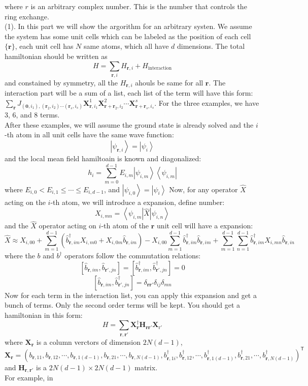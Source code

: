 \documentclass[letter]{article}
\begin{document}
where $r$ is an arbitrary complex number. This is the number that controls the ring exchange.
\\
\indent (1). In this part we will show the argorithm for an arbitrary systen. We assume the system has some unit cells which can be labeled as the position of each cell $\{\bm{r}\}$, each unit cell has $N$ same atoms, which all have $d$ dimensions. The total hamiltonian should be written as $$
H=\sum_{\bm{r},i}H_{\bm{r},i}+H_{\mathrm{interaction}}
$$ and constained by symmetry, all the $H_{\bm{r},i}$ ahouls be same for all $\bm{r}$. The interaction part will be a sum of a list, each list of the term will have this form: $\sum_{\bm{r}}J_{(\bm{0},i_1),(\bm{r}_2,i_2)\cdots (\bm{r}_s,i_s)} \bm{X}^1_{\bm{r},i_1} \bm{X}^2_{\bm{r}+\bm{r}_2,i_2} \cdots\bm{X}^s_{\bm{r}+\bm{r}_s,i_s}$. For the three examples, we have 3, 6, and 8 terms. \\
 After these examples, we will assume the ground state is already solved and the $i$-th atom in all unit cells have the same wave function:$$
\left|\psi_{\bm{r},i}\right>=\left|\psi_i\right>
$$
and the local mean field hamiltoain is known and diagonalized:
$$
h_i=\sum_{m=0}^{d-1}E_{i,m}\left|\psi_{i,m}\right>\left<\psi_{i,m}\right|
$$
where $E_{i,0}<E_{i,1}\leqslant \cdots\leqslant E_{i,d-1}$, and $\left|\psi_{i,0}\right>=\left|\psi_i\right>$
Now, for any operator $\hat{X}$ acting on the $i$-th atom, we will introduce a expansion, define number: $$
X_{i,mn}=\left<\psi_{i,m}\right|\hat{X}\left|\psi_{i,n}\right>
$$
and the $\hat{X}$ operator acting on $i$-th  atom of the $\bm{r}$ unit cell will have a expansion:
$$
\hat{X}\approx X_{i,00}+\sum_{m=1}^{d-1}\left(\hat{b}_{\bm{r},im}^{\dagger}X_{i,m0}+X_{i,0m}\hat{b}_{\bm{r},im}\right)-X_{i,00}\sum_{m=1}^{d-1}\hat{b}^{\dagger}_{\bm{r},im}\hat{b}_{\bm{r},im}
+\sum_{m=1}^{d-1}\sum_{n=1}^{d-1}\hat{b}^{\dagger}_{\bm{r},im}X_{i,mn}\hat{b}_{\bm{r},in}$$
where the $b$ and $b^{\dagger}$ operators follow the commutation relations:
$$
\left[\hat{b}_{\bm{r},im},\hat{b}_{\bm{r}',jn}\right]=\left[\hat{b}^{\dagger}_{\bm{r},im},\hat{b}^{\dagger}_{\bm{r}',jn}\right]=0$$
$$
\left[\hat{b}_{\bm{r},im},\hat{b}^{\dagger}_{\bm{r}',jn}\right]=\delta_{\bm{r}\bm{r}'}\delta_{ij}\delta_{mn}$$
Now for each term in the interaction list, you can apply this expansion and get a bunch of terms. Only the second order terms will be kept. You should get a hamiltonian in this form:
 $$H=\sum_{\bm{r},\bm{r}'}\mathbf{X}^{\dagger}_{\bm{r}}\mathbf{H}_{\bm{r}\bm{r}'}\mathbf{X}_{\mathrm{r}'}$$
 where $\mathbf{X}_{\bm{r}}$ is a column verctors of dimension $2N(d-1)$, $$\mathbf{X}_{\bm{r}}=\left(b_{\bm{r},11},b_{\bm{r},12},\cdots,b_{\bm{r},1(d-1)},b_{\bm{r},21},\cdots,b_{\bm{r},N(d-1)},b_{\bm{r},1i}^{\dagger},b_{\bm{r},12}^{\dagger},\cdots,b_{\bm{r},1(d-1)}^{\dagger},b_{\bm{r},21}^{\dagger},\cdots,b_{\bm{r},N(d-1)}^{\dagger}\right)^{\mathsf{T}}$$
 and $\mathbf{H}_{\bm{r},\bm{r}'}$ is a $2N(d-1)\times 2N(d-1)$ matrix.\\
 For example, in 
\end{document}
